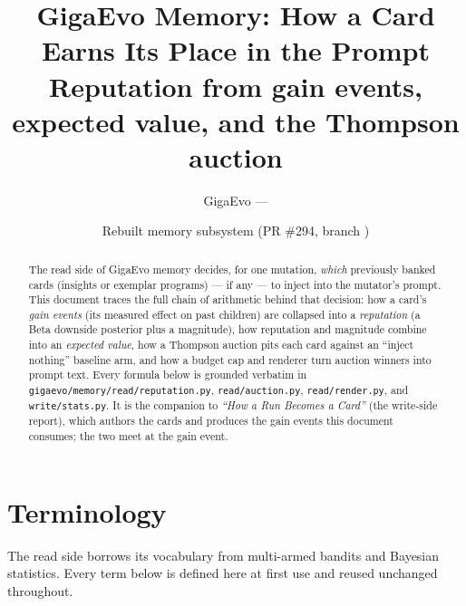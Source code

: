 \documentclass[11pt]{article}
\title{\textbf{GigaEvo Memory: How a Card Earns Its Place in the Prompt}\\[2pt]
\large Reputation from gain events, expected value, and the Thompson auction}
\author{GigaEvo --- \code{gigaevo/memory/read}}
\date{Rebuilt memory subsystem (PR \#294, branch \code{refactor/memory-rebuild})}
\newcommand{\code}[1]{\texttt{\small #1}}
\begin{document}
\maketitle

\begin{abstract}
The read side of GigaEvo memory decides, for one mutation, \emph{which} previously
banked cards (insights or exemplar programs) --- if any --- to inject into the
mutator's prompt. This document traces the full chain of arithmetic behind that
decision: how a card's \emph{gain events} (its measured effect on past children)
are collapsed into a \emph{reputation} (a Beta downside posterior plus a magnitude),
how reputation and magnitude combine into an \emph{expected value}, how a Thompson
auction pits each card against an ``inject nothing'' baseline arm, and how a budget
cap and renderer turn auction winners into prompt text. Every formula below is
grounded verbatim in \code{gigaevo/memory/read/reputation.py},
\code{read/auction.py}, \code{read/render.py}, and \code{write/stats.py}. It is the
companion to \emph{``How a Run Becomes a Card''} (the write-side report), which
authors the cards and produces the gain events this document consumes; the two
meet at the gain event.
\end{abstract}

\section*{Terminology}

The read side borrows its vocabulary from multi-armed bandits and Bayesian
statistics. Every term below is defined here at first use and reused unchanged
throughout.
\end{document}
